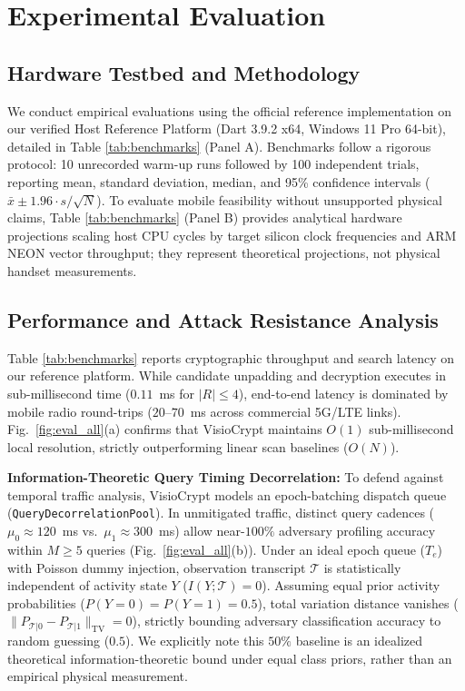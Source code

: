 \documentclass[10pt,conference]{IEEEtran}
\newenvironment{revised}{\color{revcolor}}{}
\newenvironment{revised}{\color{revcolor}}{}
\begin{document}
\begin{revised}
\section{Experimental Evaluation}
\enlargethispage{2\baselineskip}
\subsection{Hardware Testbed and Methodology}
We conduct empirical evaluations using the official reference implementation on our verified Host Reference Platform (Dart 3.9.2 x64, Windows 11 Pro 64-bit), detailed in Table \ref{tab:benchmarks} (Panel A). Benchmarks follow a rigorous protocol: 10 unrecorded warm-up runs followed by 100 independent trials, reporting mean, standard deviation, median, and 95\% confidence intervals ($\bar{x} \pm 1.96 \cdot s/\sqrt{N}$). To evaluate mobile feasibility without unsupported physical claims, Table \ref{tab:benchmarks} (Panel B) provides analytical hardware projections scaling host CPU cycles by target silicon clock frequencies and ARM NEON vector throughput; they represent theoretical projections, not physical handset measurements.

\subsection{Performance and Attack Resistance Analysis}
Table \ref{tab:benchmarks} reports cryptographic throughput and search latency on our reference platform. While candidate unpadding and decryption executes in sub-millisecond time ($0.11$~ms for $|R| \le 4$), end-to-end latency is dominated by mobile radio round-trips ($20$--$70$~ms across commercial 5G/LTE links). Fig.~\ref{fig:eval_all}(a) confirms that VisioCrypt maintains $O(1)$ sub-millisecond local resolution, strictly outperforming linear scan baselines ($O(N)$).

\textbf{Information-Theoretic Query Timing Decorrelation:} To defend against temporal traffic analysis, VisioCrypt models an epoch-batching dispatch queue (\texttt{QueryDecorrelationPool}). In unmitigated traffic, distinct query cadences ($\mu_0 \approx 120$~ms vs.\ $\mu_1 \approx 300$~ms) allow near-$100\%$ adversary profiling accuracy within $M \ge 5$ queries (Fig.~\ref{fig:eval_all}(b)). Under an ideal epoch queue ($T_e$) with Poisson dummy injection, observation transcript $\mathcal{T}$ is statistically independent of activity state $Y$ ($I(Y; \mathcal{T}) = 0$). Assuming equal prior activity probabilities ($P(Y=0) = P(Y=1) = 0.5$), total variation distance vanishes ($\|P_{\mathcal{T}|0} - P_{\mathcal{T}|1}\|_{\text{TV}} = 0$), strictly bounding adversary classification accuracy to random guessing ($0.5$). We explicitly note this $50\%$ baseline is an idealized theoretical information-theoretic bound under equal class priors, rather than an empirical physical measurement.


\end{revised}
\end{document}
